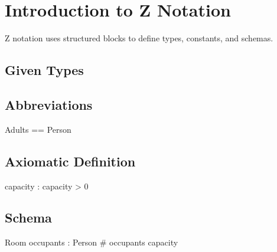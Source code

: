 \documentclass[a4paper,10pt,fleqn]{article}
\begin{document}
\section*{Introduction to Z Notation}

\noindent Z notation uses structured blocks to define types, constants, and schemas.

\bigskip

\subsection*{Given Types}

\begin{zed}[Person]\end{zed}

\subsection*{Abbreviations}

\begin{zed}
Adults == \power Person
\end{zed}

\subsection*{Axiomatic Definition}

\begin{axdef}
capacity : \nat
\where
capacity > 0
\end{axdef}

\subsection*{Schema}

\begin{schema}{Room}
occupants : \power Person
\where
\# occupants \leq capacity
\end{schema}
\end{document}
